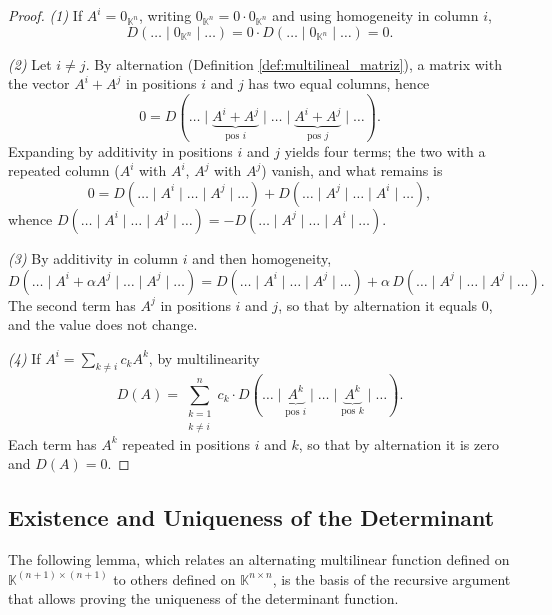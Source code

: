 \documentclass[11pt, a4paper]{article}
\begin{document}
\begin{proof}
\textit{(1)} If $A^i = 0_{\mathbb{K}^n}$, writing $0_{\mathbb{K}^n} = 0 \cdot 0_{\mathbb{K}^n}$ and using homogeneity in column $i$,
\[
D(\dots \mid 0_{\mathbb{K}^n} \mid \dots) = 0 \cdot D(\dots \mid 0_{\mathbb{K}^n} \mid \dots) = 0.
\]

\textit{(2)} Let $i \neq j$. By alternation (Definition \ref{def:multilineal_matriz}), a matrix with the vector $A^i + A^j$ in positions $i$ and $j$ has two equal columns, hence
\[
0 = D(\dots \mid \underbrace{A^i+A^j}_{\text{pos } i} \mid \dots \mid \underbrace{A^i+A^j}_{\text{pos } j} \mid \dots).
\]
Expanding by additivity in positions $i$ and $j$ yields four terms; the two with a repeated column ($A^i$ with $A^i$, $A^j$ with $A^j$) vanish, and what remains is
\[
0 = D(\dots \mid A^i \mid \dots \mid A^j \mid \dots) + D(\dots \mid A^j \mid \dots \mid A^i \mid \dots),
\]
whence $D(\dots \mid A^i \mid \dots \mid A^j \mid \dots) = - D(\dots \mid A^j \mid \dots \mid A^i \mid \dots)$.

\textit{(3)} By additivity in column $i$ and then homogeneity,
\[
D(\dots \mid A^i + \alpha A^j \mid \dots \mid A^j \mid \dots) = D(\dots \mid A^i \mid \dots \mid A^j \mid \dots) + \alpha\, D(\dots \mid A^j \mid \dots \mid A^j \mid \dots).
\]
The second term has $A^j$ in positions $i$ and $j$, so that by alternation it equals $0$, and the value does not change.

\textit{(4)} If $A^i = \sum_{k \neq i} c_k A^k$, by multilinearity
\[
D(A) = \sum_{\substack{k=1 \\ k \neq i}}^{n} c_k \cdot D(\dots \mid \underbrace{A^k}_{\text{pos } i} \mid \dots \mid \underbrace{A^k}_{\text{pos } k} \mid \dots).
\]
Each term has $A^k$ repeated in positions $i$ and $k$, so that by alternation it is zero and $D(A) = 0$.
\end{proof}

\subsection{Existence and Uniqueness of the Determinant}

The following lemma, which relates an alternating multilinear function defined on $\mathbb{K}^{(n+1) \times (n+1)}$ to others defined on $\mathbb{K}^{n \times n}$, is the basis of the recursive argument that allows proving the uniqueness of the determinant function.
\end{document}
